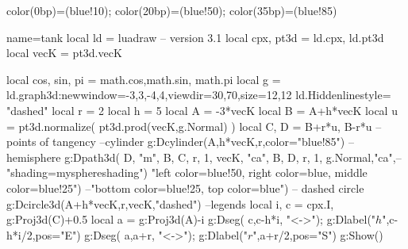 \documentclass[border=5pt]{standalone}%
\begin{document}
{\pgfpoint{0 bp}{-10 bp}}
{color(0bp)=(blue!10); color(20bp)=(blue!50); color(35bp)=(blue!85)}%

\begin{luadraw}{name=tank}
local ld = luadraw -- version 3.1
local cpx, pt3d = ld.cpx, ld.pt3d
local vecK = pt3d.vecK

local cos, sin, pi = math.cos,math.sin, math.pi
local g = ld.graph3d:new{window={-3,3,-4,4},viewdir={30,70},size={12,12}}
ld.Hiddenlinestyle= "dashed"
local r = 2
local h = 5
local A = -3*vecK
local B = A+h*vecK
local u = pt3d.normalize( pt3d.prod(vecK,g.Normal) )
local C, D = B+r*u, B-r*u -- points of tangency
--cylinder
g:Dcylinder(A,h*vecK,r,{color="blue!85"})
--hemisphere
g:Dpath3d( {D, "m", B, C, r, 1, vecK, "ca", B, D, r, 1, g.Normal,"ca"},-- "shading=mysphereshading")
    "left color=blue!50, right color=blue, middle color=blue!25")
    --"bottom color=blue!25, top color=blue")
-- dashed circle
g:Dcircle3d(A+h*vecK,r,vecK,"dashed")
--legends
local i, c = cpx.I, g:Proj3d(C)+0.5
local a = g:Proj3d(A)-i
g:Dseg( {c,c-h*i}, "<->"); g:Dlabel("$h$",c-h*i/2,{pos="E"})
g:Dseg( {a,a+r}, "<->"); g:Dlabel("$r$",a+r/2,{pos="S"})
g:Show()
\end{luadraw}
\end{document}
